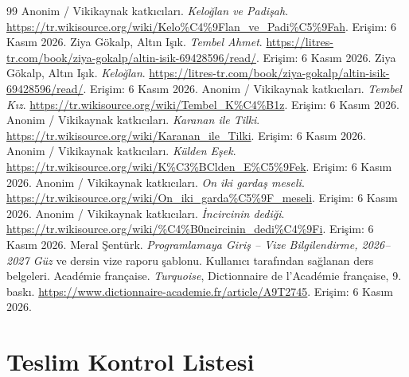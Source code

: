 \documentclass[12pt,a4paper]{article}
\begin{document}
\begin{thebibliography}{99}
 Anonim / Vikikaynak katkıcıları. \emph{Keloğlan ve Padişah}. \url{https://tr.wikisource.org/wiki/Kelo%C4%9Flan_ve_Padi%C5%9Fah}. Erişim: 6 Kasım 2026.
 Ziya Gökalp, Altın Işık. \emph{Tembel Ahmet}. \url{https://litres-tr.com/book/ziya-gokalp/altin-isik-69428596/read/}. Erişim: 6 Kasım 2026.
 Ziya Gökalp, Altın Işık. \emph{Keloğlan}. \url{https://litres-tr.com/book/ziya-gokalp/altin-isik-69428596/read/}. Erişim: 6 Kasım 2026.
 Anonim / Vikikaynak katkıcıları. \emph{Tembel Kız}. \url{https://tr.wikisource.org/wiki/Tembel_K%C4%B1z}. Erişim: 6 Kasım 2026.
 Anonim / Vikikaynak katkıcıları. \emph{Karanan ile Tilki}. \url{https://tr.wikisource.org/wiki/Karanan_ile_Tilki}. Erişim: 6 Kasım 2026.
 Anonim / Vikikaynak katkıcıları. \emph{Külden Eşek}. \url{https://tr.wikisource.org/wiki/K%C3%BClden_E%C5%9Fek}. Erişim: 6 Kasım 2026.
 Anonim / Vikikaynak katkıcıları. \emph{On iki gardaş meseli}. \url{https://tr.wikisource.org/wiki/On_iki_garda%C5%9F_meseli}. Erişim: 6 Kasım 2026.
 Anonim / Vikikaynak katkıcıları. \emph{İncircinin dediği}. \url{https://tr.wikisource.org/wiki/%C4%B0ncircinin_dedi%C4%9Fi}. Erişim: 6 Kasım 2026.
 Meral Şentürk. \emph{Programlamaya Giriş -- Vize Bilgilendirme,
2026--2027 Güz} ve dersin vize raporu şablonu. Kullanıcı tarafından sağlanan ders belgeleri.
 Académie française. \emph{Turquoise}, Dictionnaire de l'Académie française, 9. baskı. \url{https://www.dictionnaire-academie.fr/article/A9T2745}. Erişim: 6 Kasım 2026.
\end{thebibliography}

\appendix
\section{Teslim Kontrol Listesi}
\end{document}
